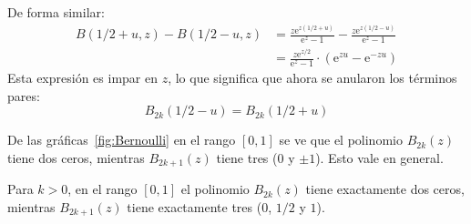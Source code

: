   De forma similar:
  \begin{align*}
    B \left( 1 / 2 + u, z \right)
	- B \left( 1 / 2 - u, z \right)
      &= \frac{z \mathrm{e}^{z (1 / 2 + u)}}{\mathrm{e}^z - 1}
	   - \frac{z \mathrm{e}^{z (1 / 2 - u)}}
		  {\mathrm{e}^z - 1} \\
      &= \frac{z \mathrm{e}^{z / 2}}{\mathrm{e}^z - 1}
	   \cdot \left(
		   \mathrm{e}^{z u} - \mathrm{e}^{- z u}
		 \right)
  \end{align*}
  Esta expresión es impar en \(z\),
  lo que significa que ahora se anularon los términos pares:
  \begin{equation*}
    B_{2 k}(1 / 2 - u)
      = B_{2 k}(1 / 2 + u)
  \end{equation*}

  De las gráficas~\ref{fig:Bernoulli}
  en el rango \([0, 1]\)
  se ve que el polinomio \(B_{2 k}(z)\) tiene dos ceros,
  mientras \(B_{2 k + 1}(z)\) tiene tres
  (0 y \(\pm 1\)).
  Esto vale en general.%
  \begin{theorem}
    \label{theo:Bernoulli-zeros}
    Para \(k > 0\),
    en el rango \([0, 1]\) el polinomio \(B_{2 k}(z)\)
    tiene exactamente dos ceros,
    mientras \(B_{2 k + 1} (z)\) tiene exactamente tres
    (\(0\), \(1 / 2\) y	 \(1\)).
  \end{theorem}
